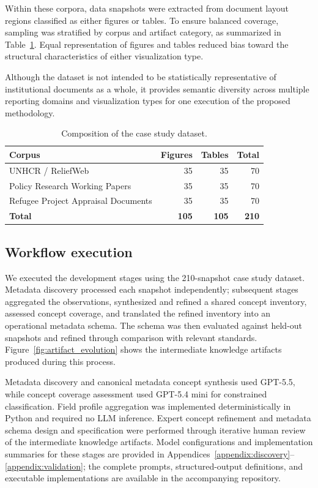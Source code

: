 \documentclass{article}
\begin{document}
Within these corpora, data snapshots were extracted from document layout regions classified as either figures or tables. To ensure balanced coverage, sampling was stratified by corpus and artifact category, as summarized in Table~\ref{tab:composition}. Equal representation of figures and tables reduced bias toward the structural characteristics of either visualization type.

Although the dataset is not intended to be statistically representative of institutional documents as a whole, it provides semantic diversity across multiple reporting domains and visualization types for one execution of the proposed methodology.

\begin{table}[!ht]
    \centering
    \caption{Composition of the case study dataset.}
    \label{tab:composition}
    \begin{tabular}{lrrr}
        \toprule
        \textbf{Corpus} & \textbf{Figures} & \textbf{Tables} & \textbf{Total} \\
        \midrule
        UNHCR / ReliefWeb & 35 & 35 & 70 \\
        Policy Research Working Papers & 35 & 35 & 70 \\
        Refugee Project Appraisal Documents & 35 & 35 & 70 \\
        \midrule
        \textbf{Total} & \textbf{105} & \textbf{105} & \textbf{210} \\
        \bottomrule
    \end{tabular}
\end{table}

\subsection{Workflow execution}

We executed the development stages using the 210-snapshot case study dataset. Metadata discovery processed each snapshot independently; subsequent stages aggregated the observations, synthesized and refined a shared concept inventory, assessed concept coverage, and translated the refined inventory into an operational metadata schema. The schema was then evaluated against held-out snapshots and refined through comparison with relevant standards. Figure~\ref{fig:artifact_evolution} shows the intermediate knowledge artifacts produced during this process.

Metadata discovery and canonical metadata concept synthesis used GPT-5.5, while concept coverage assessment used GPT-5.4 mini for constrained classification. Field profile aggregation was implemented deterministically in Python and required no LLM inference. Expert concept refinement and metadata schema design and specification were performed through iterative human review of the intermediate knowledge artifacts. Model configurations and implementation summaries for these stages are provided in Appendices~\ref{appendix:discovery}--\ref{appendix:validation}; the complete prompts, structured-output definitions, and executable implementations are available in the accompanying repository.
\end{document}
